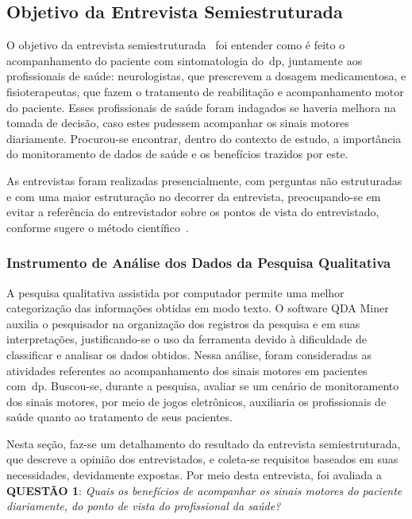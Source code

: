 \subsection{Objetivo da Entrevista Semiestruturada}
O objetivo da entrevista semiestruturada~\cite{FLI04} foi entender como é feito o acompanhamento do paciente com sintomatologia do~\ac{dp}, juntamente aos profissionais de saúde: neurologistas, que prescrevem a dosagem medicamentosa, e fisioterapeutas, que fazem o tratamento de reabilitação e acompanhamento motor do paciente. Esses profissionais de saúde foram indagados se haveria melhora na tomada de decisão, caso estes pudessem acompanhar os sinais motores diariamente. Procurou-se encontrar, dentro do contexto de estudo, a importância do monitoramento de dados de saúde e os benefícios trazidos por este.

As entrevistas foram realizadas presencialmente, com perguntas não estruturadas e com uma maior estruturação no decorrer da entrevista, preocupando-se em evitar a referência do entrevistador sobre os pontos de vista do entrevistado, conforme sugere o método científico~\cite{FLI04}. 

\subsubsection{Instrumento de Análise dos Dados da Pesquisa Qualitativa} \label{section:analise_dados} 
A pesquisa qualitativa assistida por computador permite uma melhor categorização das informações obtidas em modo texto. O software QDA Miner~\cite{qda13} auxilia o pesquisador na organização dos registros da pesquisa e em suas interpretações, justificando-se o uso da ferramenta devido à dificuldade de classificar e analisar os dados obtidos. Nessa análise, foram consideradas as atividades referentes ao acompanhamento dos sinais motores em pacientes com~\ac{dp}. Buscou-se, durante a pesquisa, avaliar se um cenário de monitoramento dos sinais motores, por meio de jogos eletrônicos, auxiliaria os profissionais de saúde quanto ao tratamento de seus pacientes.

Nesta seção, faz-se um detalhamento do resultado da entrevista semiestruturada, que descreve a opinião dos entrevistados, e coleta-se requisitos baseados em suas necessidades, devidamente expostas. Por meio desta entrevista, foi avaliada a \textbf{QUESTÃO 1}: \textit{Quais os benefícios de acompanhar os sinais motores do paciente diariamente, do ponto de vista do profissional da saúde?}




